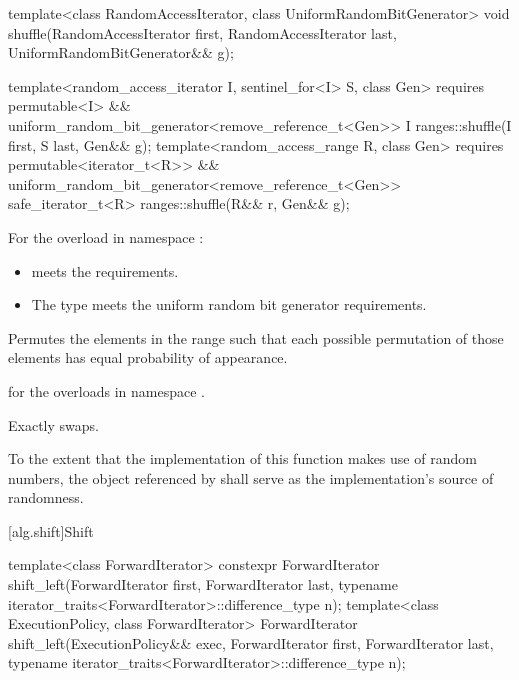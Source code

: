 %
\begin{itemdecl}
template<class RandomAccessIterator, class UniformRandomBitGenerator>
  void shuffle(RandomAccessIterator first,
               RandomAccessIterator last,
               UniformRandomBitGenerator&& g);

template<random_access_iterator I, sentinel_for<I> S, class Gen>
  requires permutable<I> &&
           uniform_random_bit_generator<remove_reference_t<Gen>>
  I ranges::shuffle(I first, S last, Gen&& g);
template<random_access_range R, class Gen>
  requires permutable<iterator_t<R>> &&
           uniform_random_bit_generator<remove_reference_t<Gen>>
  safe_iterator_t<R> ranges::shuffle(R&& r, Gen&& g);
\end{itemdecl}

\begin{itemdescr}
\pnum
\expects
For the overload in namespace :
\begin{itemize}
\item
   meets
  the  requirements.
\item
  The type  meets
  the uniform random bit generator requirements.
\end{itemize}

\pnum
\effects
Permutes the elements in the range 
such that each possible permutation of those elements
has equal probability of appearance.

\pnum
\returns
{} for the overloads in namespace .

\pnum
\complexity
Exactly  swaps.

\pnum
\remarks
To the extent that the implementation of this function makes use
of random numbers, the object referenced by  shall serve as
the implementation's source of randomness.
\end{itemdescr}

[alg.shift]{Shift}

%
\begin{itemdecl}
template<class ForwardIterator>
  constexpr ForwardIterator
    shift_left(ForwardIterator first, ForwardIterator last,
               typename iterator_traits<ForwardIterator>::difference_type n);
template<class ExecutionPolicy, class ForwardIterator>
  ForwardIterator
    shift_left(ExecutionPolicy&& exec, ForwardIterator first, ForwardIterator last,
               typename iterator_traits<ForwardIterator>::difference_type n);
\end{itemdecl}

